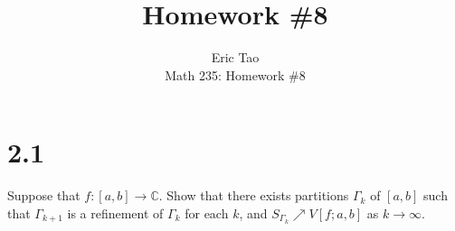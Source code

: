 \documentclass[10pt]{article}
\newenvironment{problem}[2][Problem]{\begin{trivlist}
\item[\hskip \labelsep {\bfseries #1}\hskip \labelsep {\bfseries #2.}]}{\end{trivlist}}
\begin{document}
 
\title{Homework \#8}
\author{Eric Tao\\
Math 235: Homework \#8}
\maketitle
 
\section*{2.1}

\begin{problem}{5.2.18}

Suppose that $f: [a,b] \to \mathbb{C}$. Show that there exists partitions $\Gamma_k$ of $[a,b]$ such that $\Gamma_{k+1}$ is a refinement of $\Gamma_k$ for each $k$, and $S_{\Gamma_k} \nearrow V[f; a,b]$ as $k \to \infty$.
\end{problem}
\end{document}
